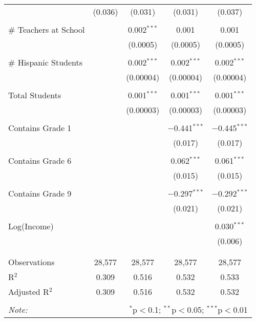 \begin{table}[!htbp]
\begin{tabular}{@{\extracolsep{-2pt}}lcccc}
  & (0.036) & (0.031) & (0.031) & (0.037) \\ 
  & & & & \\ 
 \# Teachers at School &  & 0.002$^{***}$ & 0.001 & 0.001 \\ 
  &  & (0.0005) & (0.0005) & (0.0005) \\ 
  & & & & \\ 
 \# Hispanic Students &  & 0.002$^{***}$ & 0.002$^{***}$ & 0.002$^{***}$ \\ 
  &  & (0.00004) & (0.00004) & (0.00004) \\ 
  & & & & \\ 
 Total Students &  & 0.001$^{***}$ & 0.001$^{***}$ & 0.001$^{***}$ \\ 
  &  & (0.00003) & (0.00003) & (0.00003) \\ 
  & & & & \\ 
 Contains Grade 1 &  &  & $-$0.441$^{***}$ & $-$0.445$^{***}$ \\ 
  &  &  & (0.017) & (0.017) \\ 
  & & & & \\ 
 Contains Grade 6 &  &  & 0.062$^{***}$ & 0.061$^{***}$ \\ 
  &  &  & (0.015) & (0.015) \\ 
  & & & & \\ 
 Contains Grade 9 &  &  & $-$0.297$^{***}$ & $-$0.292$^{***}$ \\ 
  &  &  & (0.021) & (0.021) \\ 
  & & & & \\ 
 Log(Income) &  &  &  & 0.030$^{***}$ \\ 
  &  &  &  & (0.006) \\ 
  & & & & \\ 
\hline \\[-1.8ex] 
Observations & 28,577 & 28,577 & 28,577 & 28,577 \\ 
R$^{2}$ & 0.309 & 0.516 & 0.532 & 0.533 \\ 
Adjusted R$^{2}$ & 0.309 & 0.516 & 0.532 & 0.532 \\ 
\hline 
\hline \\[-1.8ex] 
\textit{Note:}  & \multicolumn{4}{r}{$^{*}$p$<$0.1; $^{**}$p$<$0.05; $^{***}$p$<$0.01} \\ 
\end{tabular} 
\end{table} 
